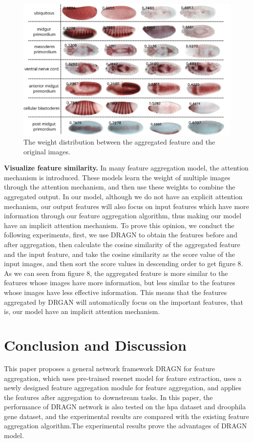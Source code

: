 \documentclass[10pt,twocolumn,letterpaper]{article}
\begin{document}
\begin{figure}
\begin{center}
\includegraphics[width=0.8\linewidth]{flycompare.JPG}
\end{center}
   \caption{The weight distribution between the aggregated feature and the original images.}
\label{fig:short}
\end{figure}

\textbf{Visualize feature similarity.} In many feature aggregation model, the attention mechanism is introduced. These models learn the weight of multiple images through the attention mechanism, and then use these weights to combine the aggregated output. In our model, although we do not have an explicit attention mechanism, our output features will also focus on input features which have more information through our feature aggregation algorithm, thus making our model have an implicit attention mechanism. To prove this opinion, we conduct the following experiments, first, we use DRAGN to obtain the features before and after aggregation, then calculate the cosine similarity of the aggregated feature and the input feature, and take the cosine similarity as the score value of the input images, and then sort the score values in descending order to get figure 8. As we can seen from figure 8, the aggregated feature is more similar to the features whose images have more information, but less similar to the features whose images have less effective information. This means that the features aggregated by DRGAN will automatically focus on the important features, that is, our model have an implicit attention mechanism.


\section{Conclusion and Discussion}
This paper proposes a general network framework DRAGN for feature aggregation, which uses pre-trained resenet model for feature extraction, uses a newly designed feature aggregation module for feature aggregation, and applies the features after aggregation to downstream tasks. In this paper, the performance of DRAGN network is also tested on the hpa dataset and droophila gene dataset, and the experimental results are compared with the existing feature aggregation algorithm.The experimental results prove the advantages of DRAGN model.
\end{document}
